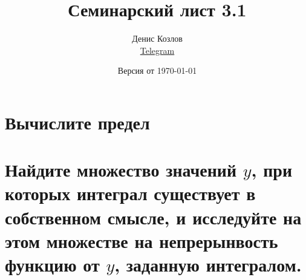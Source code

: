 \documentclass[a4paper, fleqn]{article}
\title{Семинарский лист 3.1}
\author{
    Денис Козлов         \\ \href{https://t.me/DKozl50}{Telegram} \and
}
\date{Версия от {\ddmmyyyydate\today} \currenttime}
\begin{document}
    \maketitle
    
    \section*{Вычислите предел}
    
    
    
    
    \section*{Найдите множество значений $y$, при которых интеграл существует в собственном смысле, и
    исследуйте на этом множестве на непрерынвость функцию от $y$, заданную интегралом.}
    
    
    
    
\end{document}

